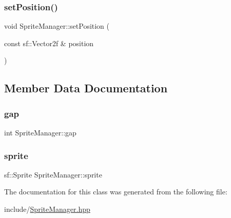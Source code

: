 \subsubsection{\texorpdfstring{setPosition()}{setPosition()}}
{\footnotesize\ttfamily void Sprite\+Manager\+::set\+Position (\begin{DoxyParamCaption}\item[{const sf\+::\+Vector2f \&}]{position }\end{DoxyParamCaption})\hspace{0.3cm}{\ttfamily [inline]}}



\subsection{Member Data Documentation}
\mbox{\label{class_sprite_manager_a57bba66a27411c59651af826b50ec11d}} 
\subsubsection{\texorpdfstring{gap}{gap}}
{\footnotesize\ttfamily int Sprite\+Manager\+::gap\hspace{0.3cm}{\ttfamily [private]}}

\mbox{\label{class_sprite_manager_aaa4c24e6db93bef8a28b38cb8de839c1}} 
\subsubsection{\texorpdfstring{sprite}{sprite}}
{\footnotesize\ttfamily sf\+::\+Sprite Sprite\+Manager\+::sprite\hspace{0.3cm}{\ttfamily [private]}}



The documentation for this class was generated from the following file\+:\begin{DoxyCompactItemize}
\item 
include/\mbox{\hyperlink{_sprite_manager_8hpp}{Sprite\+Manager.\+hpp}}\end{DoxyCompactItemize}
